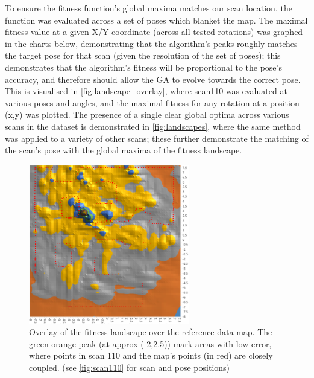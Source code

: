 \documentclass[authoryearcitations]{UoYCSproject}
\begin{document}
To ensure the fitness function's global maxima matches our scan location, the function was evaluated across a set of poses which blanket the map. The maximal fitness value at a given X/Y coordinate (across all tested rotations) was graphed in the charts below, demonstrating that the algorithm's peaks roughly matches the target pose for that scan (given the resolution of the set of poses); this demonstrates that the algorithm's fitness will be proportional to the pose's accuracy, and therefore should allow the GA to evolve towards the correct pose. This is visualised in \autoref{fig:landscape_overlay}, where scan110 was evaluated at various poses and angles, and the maximal fitness for any rotation at a position (x,y) was plotted. The presence of a single clear global optima across various scans in the dataset is demonstrated in \autoref{fig:landscapes}, where the same method was applied to a variety of other scans; these further demonstrate the matching of the scan's pose with the global maxima of the fitness landscape. \newline

\begin{figure}[ht]
\centering
	\includegraphics[width=7cm,keepaspectratio]{images/landscape_overlay.png}
	\caption{Overlay of the fitness landscape over the reference data map. The green-orange peak (at approx (-2,2.5)) mark areas with low error, where points in scan 110 and the map's points (in red) are closely coupled. (see \autoref{fig:scan110} for scan and pose positions)}
	\label{fig:landscape_overlay}
\end{figure}
\end{document}
